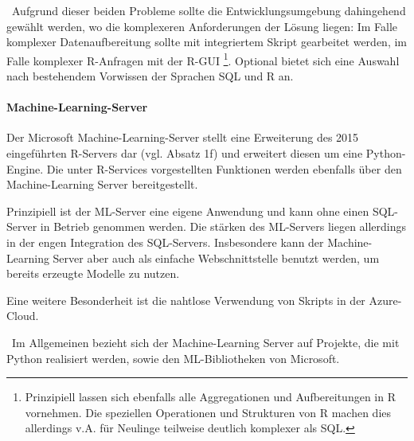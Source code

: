 ~\newline Aufgrund dieser beiden Probleme sollte die Entwicklungsumgebung dahingehend gewählt werden, wo die komplexeren Anforderungen der Lösung liegen: Im Falle komplexer Datenaufbereitung sollte mit integriertem Skript gearbeitet werden, im Falle komplexer R-Anfragen mit der R-GUI \footnote{Prinzipiell lassen sich ebenfalls alle Aggregationen und Aufbereitungen in R vornehmen. Die speziellen Operationen und Strukturen von R machen dies allerdings v.A. für Neulinge teilweise deutlich komplexer als SQL.}.  Optional bietet sich eine Auswahl nach bestehendem Vorwissen der Sprachen SQL und R an. 

\paragraph{Machine-Learning-Server} 
Der Microsoft Machine-Learning-Server stellt eine Erweiterung des 2015 eingeführten R-Servers dar (vgl. \cite{MLServerInfo} Absatz 1f) und erweitert diesen um eine Python-Engine. Die unter R-Services vorgestellten Funktionen werden ebenfalls über den Machine-Learning Server bereitgestellt. 

Prinzipiell ist der ML-Server eine eigene Anwendung und kann ohne einen SQL-Server in Betrieb genommen werden. Die stärken des ML-Servers liegen allerdings in der engen Integration des SQL-Servers. Insbesondere kann der Machine-Learning Server aber auch als einfache Webschnittstelle benutzt werden, um bereits erzeugte Modelle zu nutzen.

Eine weitere Besonderheit ist die nahtlose Verwendung von Skripts in der Azure-Cloud. 

~\newline Im Allgemeinen bezieht sich der Machine-Learning Server auf Projekte, die mit Python realisiert werden, sowie den ML-Bibliotheken von Microsoft.